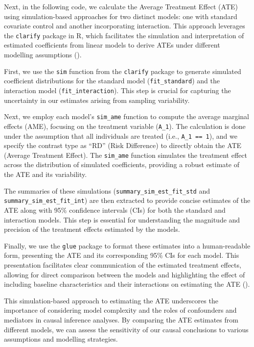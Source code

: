 \documentclass[
  singlecolumn]{article}
\begin{document}
Next, in the following code, we calculate the Average Treatment Effect
(ATE) using simulation-based approaches for two distinct models: one
with standard covariate control and another incorporating interaction.
This approach leverages the \texttt{clarify} package in R, which
facilitates the simulation and interpretation of estimated coefficients
from linear models to derive ATEs under different modelling assumptions
().

First, we use the \texttt{sim} function from the \texttt{clarify}
package to generate simulated coefficient distributions for the standard
model (\texttt{fit\_standard}) and the interaction model
(\texttt{fit\_interaction}). This step is crucial for capturing the
uncertainty in our estimates arising from sampling variability.

Next, we employ each model's \texttt{sim\_ame} function to compute the
average marginal effects (AME), focusing on the treatment variable
(\texttt{A\_1}). The calculation is done under the assumption that all
individuals are treated (i.e., \texttt{A\_1\ ==\ 1}), and we specify the
contrast type as ``RD'' (Risk Difference) to directly obtain the ATE
(Average Treatment Effect). The \texttt{sim\_ame} function simulates the
treatment effect across the distribution of simulated coefficients,
providing a robust estimate of the ATE and its variability.

The summaries of these simulations (\texttt{summary\_sim\_est\_fit\_std}
and \texttt{summary\_sim\_est\_fit\_int}) are then extracted to provide
concise estimates of the ATE along with 95\% confidence intervals (CIs)
for both the standard and interaction models. This step is essential for
understanding the magnitude and precision of the treatment effects
estimated by the models.

Finally, we use the \texttt{glue} package to format these estimates into
a human-readable form, presenting the ATE and its corresponding 95\% CIs
for each model. This presentation facilitates clear communication of the
estimated treatment effects, allowing for direct comparison between the
models and highlighting the effect of including baseline characteristics
and their interactions on estimating the ATE
().

This simulation-based approach to estimating the ATE underscores the
importance of considering model complexity and the roles of confounders
and mediators in causal inference analyses. By comparing the ATE
estimates from different models, we can assess the sensitivity of our
causal conclusions to various assumptions and modelling strategies.
\end{document}
